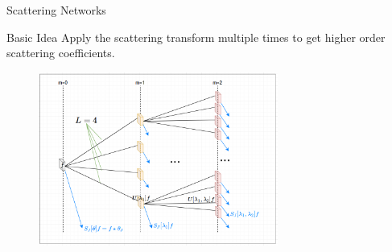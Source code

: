 \documentclass[compress]{beamer}
\begin{document}
	\begin{frame}{Scattering Networks}
		\begin{block}{Basic Idea}
			Apply the scattering transform multiple times to get higher order scattering coefficients.
		\end{block}
		\begin{figure}[!htb]
			\centering
			\includegraphics[width = 0.7\textwidth]{images/scattering_network_overview.png}
			\caption{}
			\label{fig:scattering_network}
		\end{figure}
	\end{frame}
\end{document}

